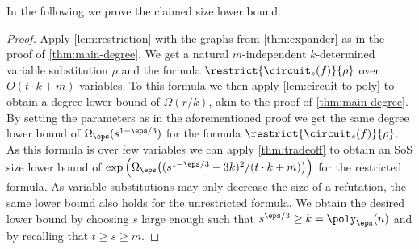 In the following we prove the claimed size lower bound.

\MainSize*

\begin{proof}
  Apply \cref{lem:restriction} with the graphs from
  \cref{thm:expander} as in the proof of \cref{thm:main-degree}. We
  get a natural $m$-independent $k$-determined variable substitution
  $\rho$ and the formula $\restrict{\circuit_s(f)}{\rho}$ over
  $O(t \cdot k + m)$ variables.  To this formula we then apply
  \cref{lem:circuit-to-poly} to obtain a degree lower bound of
  $\Omega(r/k)$, akin to the proof of \cref{thm:main-degree}. By
  setting the parameters as in the aforementioned proof we get the
  same degree lower bound of $\Omega_\eps(s^{1-\eps/3})$ for the
  formula $\restrict{\circuit_s(f)}{\rho}$. As this formula is over
  few variables we can apply \cref{thm:tradeoff} to obtain an SoS size
  lower bound of
  $\exp \Big( \Omega_\eps\big((s^{1- \eps/3} - 3k)^2/(t \cdot k +
  m)\big) \Big)$ for the restricted formula. As variable substitutions
  may only decrease the size of a refutation, the same lower bound
  also holds for the unrestricted formula. We obtain the desired lower
  bound by choosing $s$ large enough such that
  $s^{\eps/3} \ge k = \poly_\eps(n)$ and by recalling that
  $t \ge s \ge m$. 
\end{proof}
